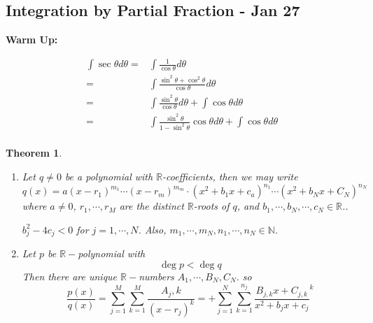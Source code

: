 \documentclass[12pt]{article}
\theoremstyle{plain}
\newtheorem{theorem}{Theorem}[subsection]
\newcommand{\mN}{{\mathbb{N}}}
\newcommand{\mR}{{\mathbb{R}}}
\begin{document}

\newpage
\subsection{Integration by Partial Fraction - Jan 27}

\textbf{Warm Up: }

\begin{align*}
	\int \sec\theta d\theta 
	=& \int \frac1{\cos\theta} d\theta\\
	=& \int \frac{\sin^2\theta + \cos^2\theta}{\cos \theta} d\theta\\
	=& \int\frac{\sin^2\theta}{\cos\theta} d\theta+\int\cos\theta d\theta\\
	=& \int \frac{\sin^2\theta}{1-\sin^2\theta}\cos\theta d\theta 
	+ \int \cos\theta d\theta \\
\end{align*}

\begin{theorem}
	$ $
	\begin{enumerate}
	\item 
	Let $q\neq 0$ be a polynomial with $\mR$-coefficients, then 
	we may write 
	\[
		q(x) = a(x-r_1)^{m_1} \cdots (x-r_m)^{m_m}\cdot
		(x^2+b_1x+c_a)^{n_1} \cdots (x^2 + b_Nx + C_N)^{n_N}
	\]
	where $a\neq 0$, $r_1, \cdots, r_M$ are the distinct $\mR$-roots
	 of $q$, and $b_1, \cdots, b_N, \cdots, c_N \in \mR$.. 

	 $b_j^2 - 4c_j < 0$ for $j=1, \cdots, N$. Also, $m_1, \cdots, m_N,
	 n_1, \cdots, n_N \in \mN$. 
	 
	\item 
	Let $p$ be $\mR-$polynomial with 
	\[
		\deg p < \deg q
	\]
	Then there are unique $\mR-$numbers $A_1, \cdots, B_N, C_N$. 
	so 
	\[
	\frac{p(x)}{q(x)} = \sum_{j=1}^M \sum_{k=1}^M \frac{A_j,k}{(x-{r_j})^k}
	= + \sum_{j=1}^N\sum_{k=1}^{n_j} \frac{B_{j,k}x + C_{j,k}}
	{x^2+b_jx+c_j}^k
\]
	\end{enumerate}
\end{theorem}
\end{document}
